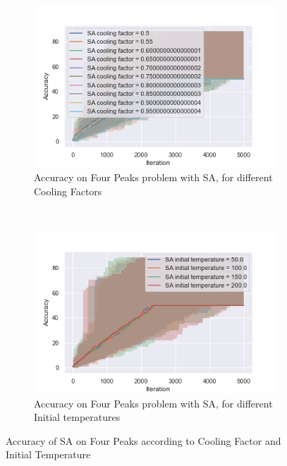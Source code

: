 \documentclass[10pt]{article}
\begin{document}
				\begin{figure}[h]
					\centering
					\begin{subfigure}[t]{0.45\columnwidth}
						\centering
						\includegraphics[width=\linewidth]{../graphics/four_peaks_SA_Iteration_Error_SA_cooling_factor.png}
						\caption{Accuracy on Four Peaks problem with SA, for different Cooling Factors}
						\label{fp:sa_cooling}
					\end{subfigure}
					~
					\begin{subfigure}[t]{0.45\columnwidth}
						\centering
						\includegraphics[width=\linewidth]{../graphics/four_peaks_SA_Iteration_Error_SA_initial_temperature.png}
						\caption{Accuracy on Four Peaks problem with SA, for different Initial temperatures}
						\label{fp:sa_initial_temp}
					\end{subfigure}
					\caption{Accuracy of SA on Four Peaks according to Cooling Factor and Initial Temperature}
					\label{fp:sa}
				\end{figure}
\end{document}
